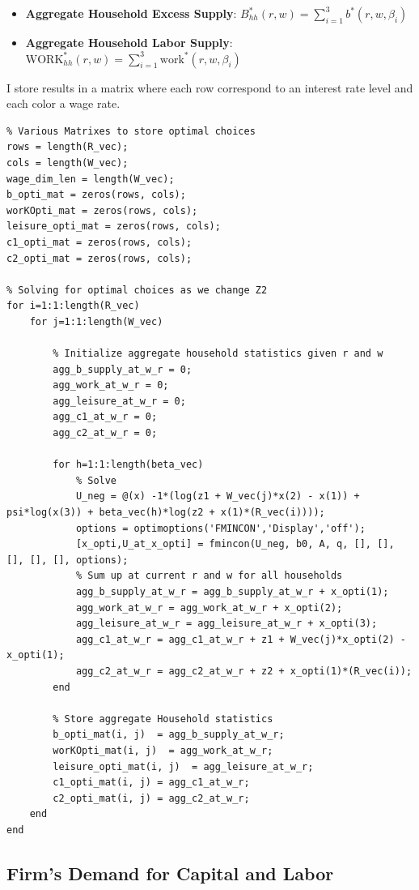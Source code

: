 \documentclass[
]{book}
\begin{document}
\begin{itemize}
\item
  \textbf{Aggregate Household Excess Supply}:
  \(B_{hh}^* (r,w)=\sum_{i=1}^3 b^* (r,w,\beta_i )\)
\item
  \textbf{Aggregate Household Labor Supply}:
  \({\textrm{WORK}}_{hh}^* (r,w)=\sum_{i=1}^3 {\textrm{work}}^* (r,w,\beta_i )\)
\end{itemize}

I store results in a matrix where each row correspond to an interest
rate level and each color a wage rate.

\begin{verbatim}
% Various Matrixes to store optimal choices
rows = length(R_vec);
cols = length(W_vec);
wage_dim_len = length(W_vec);
b_opti_mat = zeros(rows, cols);
worKOpti_mat = zeros(rows, cols);
leisure_opti_mat = zeros(rows, cols);
c1_opti_mat = zeros(rows, cols);
c2_opti_mat = zeros(rows, cols);

% Solving for optimal choices as we change Z2
for i=1:1:length(R_vec)
    for j=1:1:length(W_vec)
        
        % Initialize aggregate household statistics given r and w
        agg_b_supply_at_w_r = 0;
        agg_work_at_w_r = 0;
        agg_leisure_at_w_r = 0;
        agg_c1_at_w_r = 0;
        agg_c2_at_w_r = 0;
        
        for h=1:1:length(beta_vec)
            % Solve
            U_neg = @(x) -1*(log(z1 + W_vec(j)*x(2) - x(1)) + psi*log(x(3)) + beta_vec(h)*log(z2 + x(1)*(R_vec(i))));
            options = optimoptions('FMINCON','Display','off');
            [x_opti,U_at_x_opti] = fmincon(U_neg, b0, A, q, [], [], [], [], [], options);
            % Sum up at current r and w for all households
            agg_b_supply_at_w_r = agg_b_supply_at_w_r + x_opti(1);
            agg_work_at_w_r = agg_work_at_w_r + x_opti(2);
            agg_leisure_at_w_r = agg_leisure_at_w_r + x_opti(3);
            agg_c1_at_w_r = agg_c1_at_w_r + z1 + W_vec(j)*x_opti(2) - x_opti(1);
            agg_c2_at_w_r = agg_c2_at_w_r + z2 + x_opti(1)*(R_vec(i));
        end
        
        % Store aggregate Household statistics
        b_opti_mat(i, j)  = agg_b_supply_at_w_r;
        worKOpti_mat(i, j)  = agg_work_at_w_r;
        leisure_opti_mat(i, j)  = agg_leisure_at_w_r;
        c1_opti_mat(i, j) = agg_c1_at_w_r;
        c2_opti_mat(i, j) = agg_c2_at_w_r;
    end
end
\end{verbatim}

\hypertarget{firms-demand-for-capital-and-labor}{%
\subsection{Firm's Demand for Capital and Labor}\label{firms-demand-for-capital-and-labor}}
\end{document}
